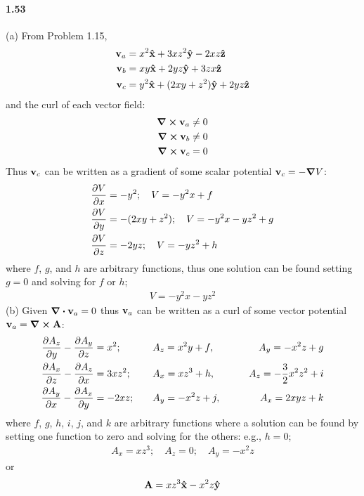 \documentclass[../main.tex]{subfiles}
\begin{document}
\paragraph{1.53}
(a) From Problem 1.15,
\begin{align*}
    \vb{v}_a &= x^2\vu{x} + 3xz^2\vu{y} - 2xz\vu{z} \\
    \vb{v}_b &= xy\vu{x} + 2yz\vu{y} + 3zx\vu{z} \\
    \vb{v}_c &= y^2\vu{x} + (2xy + z^2)\vu{y} + 2yz\vu{z} \\
\end{align*}
and the curl of each vector field:
\begin{align*}
    \curl \vb{v}_a &\neq 0 \\
    \curl \vb{v}_b &\neq 0 \\
    \curl \vb{v}_c &= 0
\end{align*}
Thus $\vb{v}_c$ can be written as a gradient of some scalar potential $\vb{v}_c = -\grad V$:
\begin{align*}
    \pdv{V}{x} &= -y^2 ;\quad V = -y^2 x + f \\
    \pdv{V}{y} &= -(2xy + z^2) ;\quad V = -y^2 x - yz^2 + g \\
    \pdv{V}{z} &= -2yz ;\quad V = -yz^2 + h 
\end{align*}
where $f$, $g$, and $h$ are arbitrary functions, thus one solution can be found setting $g = 0$ and
solving for $f$ or $h$; 
\begin{align*}
    V = -y^2 x - yz^2
\end{align*}
(b) Given $\div \vb{v}_a = 0$ thus $\vb{v}_a$ can be written as a curl of some vector potential
$\vb{v}_a = \curl \vb{A}$:
\begin{alignat*}{4}
    \pdv{A_z}{y} - \pdv{A_y}{z} &= x^2 
        ;\quad &&A_z = x^2y + f ,\quad &&&A_y = -x^2z + g \\
    \pdv{A_x}{z} - \pdv{A_z}{x} &= 3xz^2 
        ;\quad &&A_x = xz^3+ h ,\quad &&&A_z = -\frac{3}{2} x^2z^2 + i \\
    \pdv{A_y}{x} - \pdv{A_x}{y} &= -2xz 
        ;\quad &&A_y = -x^2z + j ,\quad &&&A_x = 2xyz + k 
\end{alignat*}
where $f$, $g$, $h$, $i$, $j$, and $k$ are arbitrary functions where a solution can be found by 
setting one function to zero and solving for the others: e.g., $h = 0$;
\begin{align*}
    A_x = xz^3 ;\quad A_z = 0 ;\quad A_y = -x^2z
\end{align*}
or
\begin{align*}
    \vb{A} = xz^3 \vu{x} - x^2z \vu{y}
\end{align*}
\end{document}
